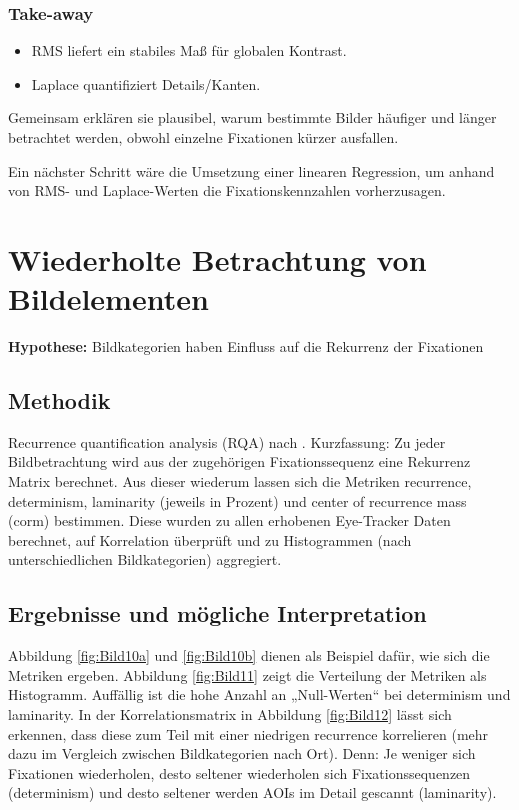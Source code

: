 \documentclass[
    language=german, %
    thesis=seminar, %
    supervisor=postdoc, %
    multiauthor=true, %
    ]{settings/csssa-thesis}
\begin{document}
\subsubsection{Take-away}
\begin{itemize}
    \item RMS liefert ein stabiles Maß für globalen Kontrast. 
    \item Laplace quantifiziert Details/Kanten. 
\end{itemize}
Gemeinsam erklären sie plausibel, warum bestimmte Bilder häufiger und länger betrachtet werden, obwohl einzelne Fixationen kürzer ausfallen. 

Ein nächster Schritt wäre die Umsetzung einer linearen Regression, um anhand von RMS- und Laplace-Werten die Fixationskennzahlen vorherzusagen. 

\section{Wiederholte Betrachtung von Bildelementen}

\textbf{Hypothese:} Bildkategorien haben Einfluss auf die Rekurrenz der Fixationen 

\subsection{Methodik}
Recurrence quantification analysis (RQA) nach \citeauthor{Anderson2013-oj}. 
Kurzfassung: Zu jeder Bildbetrachtung wird aus der zugehörigen Fixationssequenz 
eine Rekurrenz Matrix berechnet. Aus dieser wiederum lassen sich die Metriken recurrence, 
determinism, laminarity (jeweils in Prozent) und center of recurrence mass (corm) bestimmen. 
Diese wurden zu allen erhobenen Eye-Tracker Daten berechnet, auf Korrelation überprüft 
und zu Histogrammen (nach unterschiedlichen Bildkategorien) aggregiert.

\subsection{Ergebnisse und mögliche Interpretation}
Abbildung \ref{fig:Bild10a} und \ref{fig:Bild10b} dienen als Beispiel dafür, wie sich die Metriken ergeben. 
Abbildung \ref{fig:Bild11} zeigt die Verteilung der Metriken als Histogramm. Auffällig ist 
die hohe Anzahl an „Null-Werten“ bei determinism und laminarity. 
In der Korrelationsmatrix in Abbildung \ref{fig:Bild12} lässt sich erkennen, dass diese zum 
Teil mit einer niedrigen recurrence korrelieren (mehr dazu im Vergleich zwischen Bildkategorien nach Ort). 
Denn: Je weniger sich Fixationen wiederholen, desto seltener wiederholen sich 
Fixationssequenzen (determinism) und desto seltener werden AOIs im Detail gescannt (laminarity). 
\end{document}
